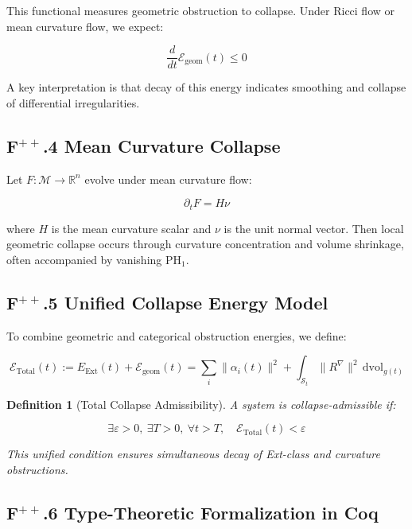 \documentclass[11pt]{article}
\newtheorem{definition}[theorem]{Definition}
\begin{document}
This functional measures geometric obstruction to collapse. Under Ricci flow or mean curvature flow, we expect:

\[
\frac{d}{dt} \mathcal{E}_{\mathrm{geom}}(t) \leq 0
\]

A key interpretation is that decay of this energy indicates smoothing and collapse of differential irregularities.

\subsection*{F$^{++}$.4 Mean Curvature Collapse}

Let \( F : \mathcal{M} \to \mathbb{R}^n \) evolve under mean curvature flow:

\[
\partial_t F = H \nu
\]

where \( H \) is the mean curvature scalar and \( \nu \) is the unit normal vector. Then local geometric collapse occurs through curvature concentration and volume shrinkage, often accompanied by vanishing \( \mathrm{PH}_1 \).

\subsection*{F$^{++}$.5 Unified Collapse Energy Model}

To combine geometric and categorical obstruction energies, we define:

\[
\mathcal{E}_{\mathrm{Total}}(t) := E_{\mathrm{Ext}}(t) + \mathcal{E}_{\mathrm{geom}}(t)
= \sum_i \| \alpha_i(t) \|^2 + \int_{\mathcal{S}_t} \| R^\nabla \|^2 \, \mathrm{dvol}_{g(t)}
\]

\begin{definition}[Total Collapse Admissibility]
A system is collapse-admissible if:

\[
\exists \varepsilon > 0,\ \exists T > 0,\ \forall t > T,\quad
\mathcal{E}_{\mathrm{Total}}(t) < \varepsilon
\]

This unified condition ensures simultaneous decay of Ext-class and curvature obstructions.
\end{definition}

\subsection*{F$^{++}$.6 Type-Theoretic Formalization in Coq}
\end{document}
